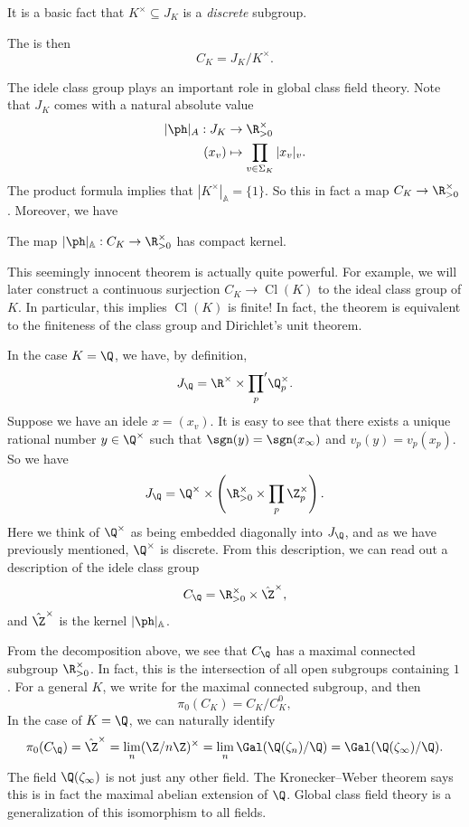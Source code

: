 \documentclass[a4paper]{article}
\newcommand\A{\mathbb{A}}
\DeclareMathOperator\Cl{\mathrm{Cl}}
\newcommand\sprime{\!{\vphantom{\prod}}'}
\begin{document}
It is a basic fact that $K^\times \subseteq J_K$ is a \emph{discrete} subgroup.
\begin{defi}
  The  is then
  \[
    C_K = J_K/K^\times.
  \]
\end{defi}
The idele class group plays an important role in global class field theory. Note that $J_K$ comes with a natural absolute value
\begin{align*}
  |\ph|_A: J_K &\to \R_{> 0}^\times\\
  (x_v) &\mapsto \prod_{v \in \Sigma_K} |x_v|_v.
\end{align*}
The product formula implies that $|K^\times|_{\A} = \{1\}$. So this in fact a map $C_K \to \R_{>0}^\times$. Moreover, we have

\begin{thm}
  The map $|\ph|_\A: C_K \to \R_{>0}^\times$ has compact kernel.
\end{thm}
This seemingly innocent theorem is actually quite powerful. For example, we will later construct a continuous surjection $C_K \to \Cl(K)$ to the ideal class group of $K$. In particular, this implies $\Cl(K)$ is finite! In fact, the theorem is equivalent to the finiteness of the class group and Dirichlet's unit theorem.

\begin{eg}
  In the case $K = \Q$, we have, by definition,
  \[
    J_{\Q} = \R^\times \times \prod_p\sprime \Q_p^\times.
  \]
  Suppose we have an idele $x = (x_v)$. It is easy to see that there exists a unique rational number $y \in \Q^\times$ such that $\sgn(y) = \sgn(x_\infty)$ and $v_p(y) = v_p(x_p)$. So we have
  \[
    J_\Q = \Q^\times \times \left(\R^\times_{>0} \times \prod_p \Z_p^\times\right).
  \]
  Here we think of $\Q^\times$ as being embedded diagonally into $J_\Q$, and as we have previously mentioned, $\Q^\times$ is discrete. From this description, we can read out a description of the idele class group
  \[
    C_\Q = \R_{>0}^\times \times \hat{\Z}^\times,
  \]
  and $\hat{\Z}^\times$ is the kernel $|\ph|_{\A}$.
\end{eg}

From the decomposition above, we see that $C_\Q$ has a maximal connected subgroup $\R^{\times}_{>0}$. In fact, this is the intersection of all open subgroups containing $1$. For a general $K$, we write  for the maximal connected subgroup, and then
\[
  \pi_0(C_K) = C_K/C_K^0,
\]
In the case of $K = \Q$, we can naturally identify
\[
  \pi_0(C_\Q) = \hat{\Z}^\times = \lim_n (\Z/n\Z)^\times = \lim_n \Gal(\Q(\zeta_n)/\Q) = \Gal(\Q(\zeta_\infty)/\Q).
\]
The field $\Q(\zeta_\infty)$ is not just any other field. The Kronecker--Weber theorem says this is in fact the maximal abelian extension of $\Q$. Global class field theory is a generalization of this isomorphism to all fields.
\end{document}
